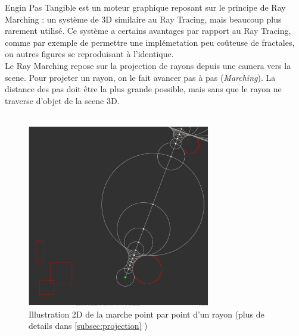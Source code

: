 
    Engin Pas Tangible est un moteur graphique reposant sur le principe de Ray Marching : un système de 3D similaire au Ray Tracing, mais beaucoup plus rarement utilisé. Ce système a certains avantages par rapport au Ray Tracing, comme par exemple de permettre une implémetation peu coûteuse de fractales, ou autres figures se reproduisant à l'identique. \\
    Le Ray Marching repose sur la projection de rayons depuis une camera vers la scene. Pour projeter un rayon, on le fait avancer pas à pas (\emph{Marching}). La distance des pas doit être la plus grande possible, mais sans que le rayon ne traverse d'objet de la scene 3D.
\\
\\
\begin{figure}[h]
    \centering
    \includegraphics[width=8cm]{images/marching.png}
    \caption{Illustration 2D de la marche point par point d'un rayon (plus de details dans \ref{subsec:projection} )}
    \label{fig:my_label}
\end{figure}
